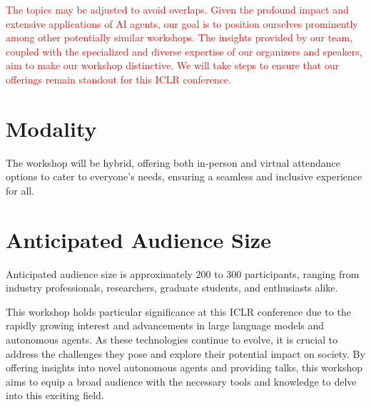 \documentclass[10pt]{article} %
\begin{document}
\textcolor{red}{The topics may be adjusted to avoid overlaps. Given the profound impact and extensive applications of AI agents, our goal is to position ourselves prominently among other potentially similar workshops. The insights provided by our team, coupled with the specialized and diverse expertise of our organizers and speakers, aim to make our workshop distinctive. We will take steps to ensure that our offerings remain standout for this ICLR conference.}

\section{Modality}
The workshop will be hybrid, offering both in-person and virtual attendance options to cater to everyone's needs, ensuring a seamless and inclusive experience for all.

\section{Anticipated Audience Size}
Anticipated audience size is approximately 200 to 300 participants, ranging from industry professionals, researchers, graduate students, and enthusiasts alike. 

This workshop holds particular significance at this ICLR conference due to the rapidly growing interest and advancements in large language models and autonomous agents. As these technologies continue to evolve, it is crucial to address the challenges they pose and explore their potential impact on society. By offering insights into novel autonomous agents and providing talks, this workshop aims to equip a broad audience with the necessary tools and knowledge to delve into this exciting field. 

\newpage
\end{document}
